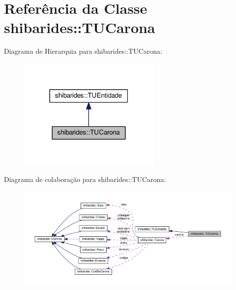\hypertarget{classshibarides_1_1TUCarona}{}\section{Referência da Classe shibarides\+:\+:T\+U\+Carona}
\label{classshibarides_1_1TUCarona}


Diagrama de Hierarquia para shibarides\+:\+:T\+U\+Carona\+:\nopagebreak
\begin{figure}[H]
\begin{center}
\leavevmode
\includegraphics[width=199pt]{classshibarides_1_1TUCarona__inherit__graph}
\end{center}
\end{figure}


Diagrama de colaboração para shibarides\+:\+:T\+U\+Carona\+:\nopagebreak
\begin{figure}[H]
\begin{center}
\leavevmode
\includegraphics[width=350pt]{classshibarides_1_1TUCarona__coll__graph}
\end{center}
\end{figure}
